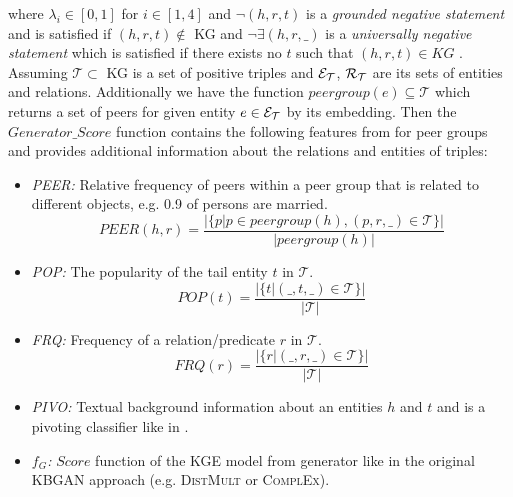 where $\lambda_i \in [0, 1]$ for $i \in [1,4]$ and $\neg (h, r, t)$ is a \textit{grounded negative statement} and is satisfied if $(h, r, t) \notin$ \ac{KG} and $\neg\exists(h, r, \_)$ is a \textit{universally negative statement} which is satisfied if there exists no $t$ such that $(h, r, t) \in KG$ \cite{arnaout2020enriching}.\\
Assuming $\mathcal{T} \subset $ \ac{KG} is a set of positive triples and $\mathcal{E}_{\mathcal{T}}$, $\mathcal{R}_{\mathcal{T}}$ are its sets of entities and relations.
Additionally we have the function $peergroup(e) \subseteq \mathcal{T}$ which returns a set of peers for given entity $e \in \mathcal{E}_{\mathcal{T}}$ by its embedding. 
Then the $Generator\_Score$ function contains the following features from \cite{arnaout2020enriching} for peer groups and provides additional information about the relations and entities of triples:
\begin{itemize}
    \item 
    \emph{\ac{PEER}:} 
    Relative frequency of peers within a peer group that is related to different objects, e.g. 0.9 of persons are married. 
    \begin{equation}
        PEER(h,r) = \frac{|\{p | p \in peergroup(h), (p, r, \_) \in \mathcal{T}\}|}{|peergroup(h)|}
    \end{equation}

    \item
    \emph{\ac{POP}:} 
    The popularity of the tail entity $t$ in $\mathcal{T}$. 
    \begin{equation}
        POP(t) = \frac{|\{t | (\_, t, \_) \in \mathcal{T}\}|}{|\mathcal{T}|}
    \end{equation}

    \item 
    \emph{\ac{FRQ}:} 
    Frequency of a relation/predicate $r$ in $\mathcal{T}$. 
    \begin{equation}
        FRQ(r) = \frac{|\{r | (\_, r, \_) \in \mathcal{T}\}|}{|\mathcal{T}|}
    \end{equation}
    
    \item 
    \emph{\ac{PIVO}:} 
    Textual background information about an entities $h$ and $t$ and is a pivoting classifier like in \cite{arnaout2020enriching}.
    
    \item 
    \emph{$f_G$:} 
    $Score$ function of the \ac{KGE}  model from generator like in the original \ac{KBGAN} approach (e.g. \textsc{DistMult}  or \textsc{ComplEx}).
    
\end{itemize}
